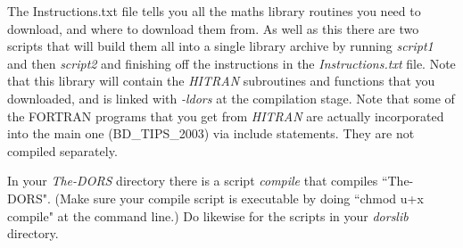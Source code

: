 \documentclass[12pt]{article}
\begin{document}
The Instructions.txt file tells you all the maths library routines you need to download, and where to download them from. 
As well as this
there are two scripts that will build them all into a single library archive by running {\it script1} and then {\it script2}
and finishing off the instructions in the {\it Instructions.txt} file.
Note that this library will contain the {\it HITRAN} subroutines and functions that you downloaded, and is linked
 with {\it -ldors} at the compilation stage. Note that some of the FORTRAN programs that you get from {\it HITRAN}
are actually incorporated into the main one (BD\_TIPS\_2003) via include statements. They are not compiled separately.

 In your {\it The-DORS} directory there 
is a script {\it compile} that compiles ``The-DORS". (Make sure your compile script is executable by doing ``chmod u+x compile"
at the command line.) Do likewise for the scripts in 
your {\it dorslib} directory.







\end{document}
